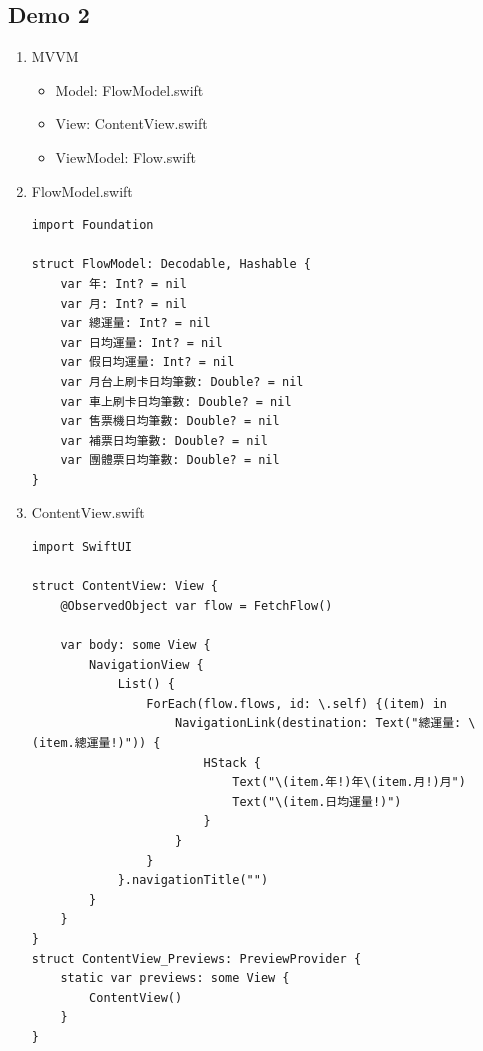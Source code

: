 \documentclass[a4paper,12pt]{article}
\begin{document}
\subsection{Demo 2}
\label{sec:orgaceddd1}
\begin{enumerate}
\item MVVM
\label{sec:orgd6c6968}
\begin{itemize}
\item Model: FlowModel.swift\\
\item View: ContentView.swift\\
\item ViewModel: Flow.swift\\
\end{itemize}
\item FlowModel.swift
\label{sec:org72d5cec}
\lstset{breaklines=true,language=swift,label= ,caption= ,captionpos=b,firstnumber=1,numbers=left}
\begin{lstlisting}
import Foundation

struct FlowModel: Decodable, Hashable {
    var 年: Int? = nil
    var 月: Int? = nil
    var 總運量: Int? = nil
    var 日均運量: Int? = nil
    var 假日均運量: Int? = nil
    var 月台上刷卡日均筆數: Double? = nil
    var 車上刷卡日均筆數: Double? = nil
    var 售票機日均筆數: Double? = nil
    var 補票日均筆數: Double? = nil
    var 團體票日均筆數: Double? = nil
}
\end{lstlisting}
\item ContentView.swift
\label{sec:org0e481c1}
\lstset{breaklines=true,language=swift,label= ,caption= ,captionpos=b,firstnumber=1,numbers=left}
\begin{lstlisting}
import SwiftUI

struct ContentView: View {
    @ObservedObject var flow = FetchFlow()

    var body: some View {
        NavigationView {
            List() {
                ForEach(flow.flows, id: \.self) {(item) in
                    NavigationLink(destination: Text("總運量: \(item.總運量!)")) {
                        HStack {
                            Text("\(item.年!)年\(item.月!)月")
                            Text("\(item.日均運量!)")
                        }
                    }
                }
            }.navigationTitle("")
        }
    }
}
struct ContentView_Previews: PreviewProvider {
    static var previews: some View {
        ContentView()
    }
}


\end{lstlisting}
\end{enumerate}
\end{document}
